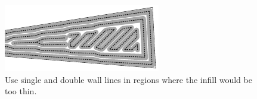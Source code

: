 \begin{figure}[H]
\centering
\includegraphics[width=.99\columnwidth]{sources/method/wedge_and_infill.pdf}
\caption{Use single and double wall lines in regions where the infill would be too thin.}
\label{wedge_and_infill}
\end{figure}























































